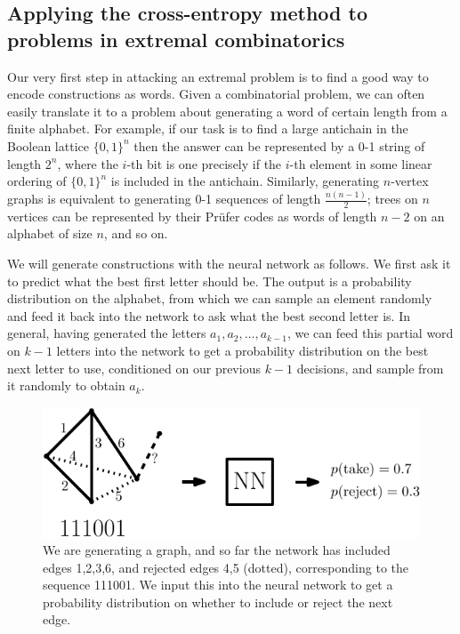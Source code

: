 \documentclass[11pt,english]{article}
\theoremstyle{plain}
\theoremstyle{remark}
\begin{document}
\subsection{Applying the cross-entropy method to problems in extremal combinatorics}\label{subsec:crossentropy}



Our very first step in attacking an extremal problem is to find a good way to encode constructions as words. Given a combinatorial problem, we can often easily translate it to a problem about generating a word of certain length from a finite alphabet. For example, if our task is to find a large antichain in the Boolean lattice $\{0,1\}^n$ then the answer can be represented by a 0-1 string of length $2^n$, where the $i$-th bit is one precisely if the $i$-th element in some linear ordering of $\{0,1\}^n$ is included in the antichain. Similarly, generating $n$-vertex graphs is equivalent to generating 0-1 sequences of length $\frac{n(n-1)}{2}$; trees on $n$ vertices can be represented by their Pr\"ufer codes as words of length $n-2$ on an alphabet of size $n$, and so on. 


We will generate constructions with the neural network as follows. We first ask it to predict what the best first letter should be. The output is a probability distribution on the alphabet, from which we can sample an element randomly and feed it back into the network to ask what the best second letter is. In general, having generated the letters $a_1,a_2,\ldots,a_{k-1}$, we can feed this partial word on $k-1$ letters into the network to get a probability distribution on the best next letter to use, conditioned on our previous $k-1$ decisions, and sample from it randomly to obtain $a_k$.


\begin{figure}[hbt]
    \centering
    \includegraphics{nn.pdf}
    \caption{We are generating a graph, and so far the network has included edges 1,2,3,6, and rejected edges 4,5 (dotted), corresponding to the sequence 111001. We input this into the neural network to get a probability distribution on whether to include or reject the next edge.}
    \label{fig:nn_illustration}
\end{figure}
\end{document}
